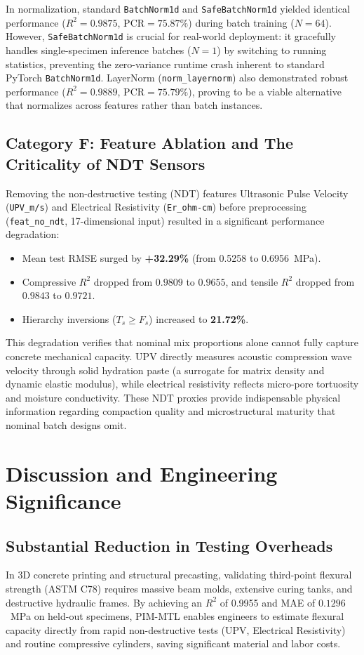 \documentclass[conference]{IEEEtran}
\begin{document}
In normalization, standard \texttt{BatchNorm1d} and \texttt{SafeBatchNorm1d} yielded identical performance ($R^2 = 0.9875$, $\text{PCR} = 75.87\%$) during batch training ($N=64$). However, \texttt{SafeBatchNorm1d} is crucial for real-world deployment: it gracefully handles single-specimen inference batches ($N=1$) by switching to running statistics, preventing the zero-variance runtime crash inherent to standard PyTorch \texttt{BatchNorm1d}. LayerNorm (\texttt{norm\_layernorm}) also demonstrated robust performance ($R^2 = 0.9889$, $\text{PCR} = 75.79\%$), proving to be a viable alternative that normalizes across features rather than batch instances.

\subsection{Category F: Feature Ablation and The Criticality of NDT Sensors}
Removing the non-destructive testing (NDT) features Ultrasonic Pulse Velocity (\texttt{UPV\_m/s}) and Electrical Resistivity (\texttt{Er\_ohm-cm}) before preprocessing (\texttt{feat\_no\_ndt}, 17-dimensional input) resulted in a significant performance degradation:
\begin{itemize}
    \item Mean test RMSE surged by \textbf{+32.29\%} (from 0.5258 to 0.6956~MPa).
    \item Compressive $R^2$ dropped from $0.9809$ to $0.9655$, and tensile $R^2$ dropped from $0.9843$ to $0.9721$.
    \item Hierarchy inversions ($T_s \ge F_s$) increased to \textbf{21.72\%}.
\end{itemize}
This degradation verifies that nominal mix proportions alone cannot fully capture concrete mechanical capacity. UPV directly measures acoustic compression wave velocity through solid hydration paste (a surrogate for matrix density and dynamic elastic modulus), while electrical resistivity reflects micro-pore tortuosity and moisture conductivity. These NDT proxies provide indispensable physical information regarding compaction quality and microstructural maturity that nominal batch designs omit.

\section{Discussion and Engineering Significance}

\subsection{Substantial Reduction in Testing Overheads}
In 3D concrete printing and structural precasting, validating third-point flexural strength (ASTM C78) requires massive beam molds, extensive curing tanks, and destructive hydraulic frames. By achieving an $R^2$ of 0.9955 and MAE of $0.1296$~MPa on held-out specimens, PIM-MTL enables engineers to estimate flexural capacity directly from rapid non-destructive tests (UPV, Electrical Resistivity) and routine compressive cylinders, saving significant material and labor costs.
\end{document}
